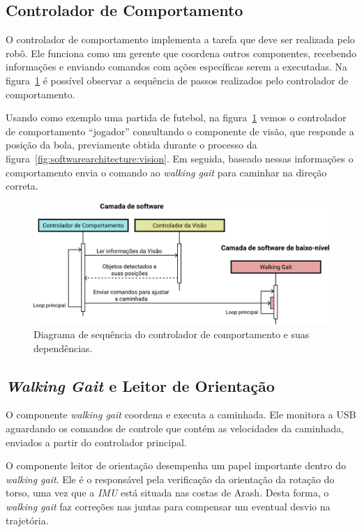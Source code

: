 \subsection{Controlador de Comportamento}

O controlador de comportamento implementa a tarefa que deve ser realizada pelo robô. Ele funciona como um gerente que coordena outros componentes, recebendo informações e enviando comandos com ações específicas serem a executadas. Na figura~\ref{fig:softwarearchitecture:software} é possível observar a sequência de passos realizados pelo controlador de comportamento.

Usando como exemplo uma partida de futebol, na figura~\ref{fig:softwarearchitecture:software} vemos o controlador de comportamento ``jogador'' consultando o componente de visão, que responde a posição da bola, previamente obtida durante o processo da figura~\ref{fig:softwarearchitecture:vision}. Em seguida, baseado nessas informações o comportamento envia o comando ao \textit{walking gait} para caminhar na direção correta.

\begin{figure}[htb]
	\centering
	\includegraphics[scale=1]{imagens/svg/softwarearchitecture-software}
	\caption{Diagrama de sequência do controlador de comportamento e suas dependências.}
	\label{fig:softwarearchitecture:software}
\end{figure}

\subsection{\textit{Walking Gait} e Leitor de Orientação}

O componente \textit{walking gait} coordena e executa a caminhada. Ele monitora a USB aguardando os comandos de controle que contém as velocidades da caminhada, enviados a partir do controlador principal.

O componente leitor de orientação desempenha um papel importante dentro do \textit{walking gait}. Ele é o responsável pela verificação da orientação da rotação do torso, uma vez que a \textit{IMU} está situada nas costas de Arash. Desta forma, o \textit{walking gait} faz correções nas juntas para compensar um eventual desvio na trajetória.

